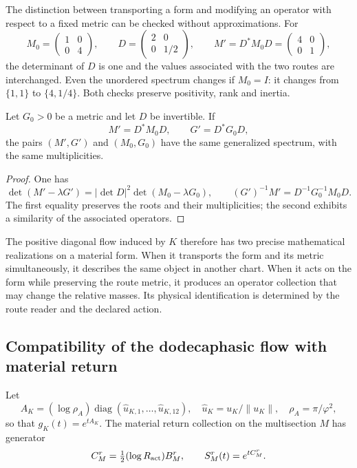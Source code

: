 The distinction between transporting a form and modifying an
operator with respect to a fixed metric can be checked without approximations.
For
\[
 M_0=\begin{pmatrix}1&0\\0&4\end{pmatrix},\qquad
 D=\begin{pmatrix}2&0\\0&1/2\end{pmatrix},\qquad
 M'=D^*M_0D=\begin{pmatrix}4&0\\0&1\end{pmatrix},
\]
the determinant of \(D\) is one and the values associated with the two
routes are interchanged. Even the unordered spectrum changes if
\(M_0=I\): it changes from \(\{1,1\}\) to \(\{4,1/4\}\).
Both checks preserve positivity, rank and inertia.

\begin{proposition}
Let \(G_0>0\) be a metric and let \(D\) be invertible. If
\[
 M'=D^*M_0D,\qquad G'=D^*G_0D,
\]
the pairs \((M',G')\) and \((M_0,G_0)\) have the same generalized
spectrum, with the same multiplicities.
\end{proposition}
\begin{proof}
One has
\[
 \det(M'-\lambda G')=|\det D|^2\det(M_0-\lambda G_0),
 \qquad (G')^{-1}M'=D^{-1}G_0^{-1}M_0D.
\]
The first equality preserves the roots and their multiplicities; the
second exhibits a similarity of the associated operators.
\end{proof}

The positive diagonal flow induced by \(K\) therefore has two precise
mathematical realizations on a material form. When it transports
the form and its metric simultaneously, it describes the same
object in another chart. When it acts on the form while preserving the route
metric, it produces an operator collection that may change the relative
masses. Its physical identification is determined by the route reader and
the declared action.

\subsection{Compatibility of the dodecaphasic flow with material return}

Let
\[
 A_K=(\log\rho_A)\operatorname{diag}(\widehat u_{K,1},\ldots,
       \widehat u_{K,12}),\quad
 \widehat u_K=u_K/\|u_K\|,\quad \rho_A=\pi/\varphi^2,
\]
so that \(g_K(t)=e^{tA_K}\). The material return collection
on the multisection \(M\) has generator
\[
 C_M^r=\tfrac12(\log R_{\rm act})B_M^r,\qquad
 S_M^r(t)=e^{tC_M^r}.
\]

